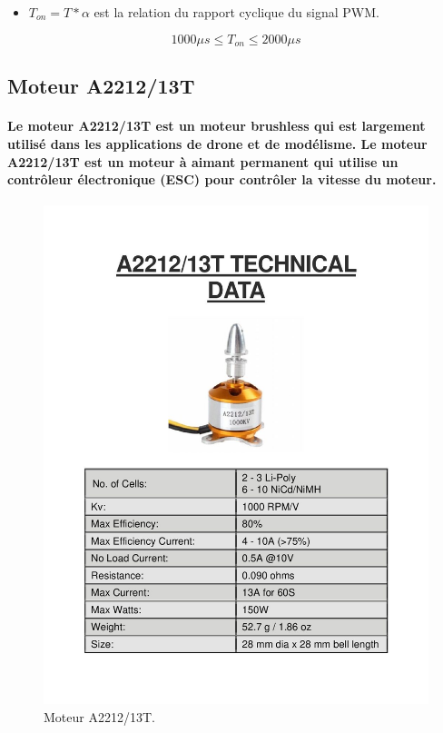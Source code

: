 \begin{itemize}
	\item $T_{on} = T * \alpha$ est la relation du rapport cyclique du signal PWM.
\end{itemize}

\begin{equation}
	1000\mu s \leq T_{on} \leq 2000\mu s
\end{equation}

\subsection{Moteur A2212/13T}

\paragraph{Le moteur A2212/13T est un moteur brushless qui est largement utilisé dans les applications de drone et de modélisme. Le moteur A2212/13T est un moteur à aimant permanent qui utilise un contrôleur électronique (ESC) pour contrôler la vitesse du moteur.}

\begin{figure}[!htpb]
	\centering
	\includegraphics[width=\linewidth]{Figures/motor.jpg}
	\caption[Moteur A2212/13T]{Moteur A2212/13T.}
\end{figure}

